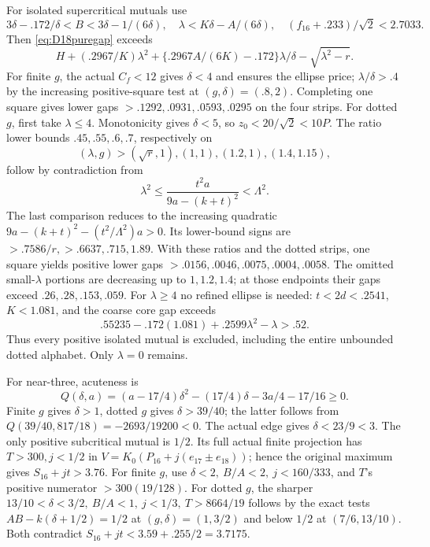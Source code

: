 For isolated supercritical mutuals use
\[
 3\delta-.172/\delta<B<3\delta-1/(6\delta),\quad
 \lambda<K\delta-A/(6\delta),\quad
 (f_{16}+.233)/\sqrt2<2.7033.
\]
Then \eqref{eq:D18puregap} exceeds
\[
 H+(.2967/K)\lambda^2+
 \{.2967A/(6K)-.172\}\lambda/\delta-\sqrt{\lambda^2-r}.
\]
For finite \(g\), the actual \(C_f<12\) gives \(\delta<4\)
and ensures the ellipse price; \(\lambda/\delta>.4\)
by the increasing positive-square test at \((g,\delta)=(.8,2)\).
Completing one square gives lower gaps
\(>.1292,.0931,.0593,.0295\) on the four strips.
For dotted \(g\), first take \(\lambda\leq4\).
Monotonicity gives \(\delta<5\), so
\(z_0<20/\sqrt2<10P\).
The ratio lower bounds \(.45,.55,.6,.7\), respectively on
\[
 (\lambda,g)>(\sqrt r,1),(1,1),(1.2,1),(1.4,1.15),
\]
follow by contradiction from
\[
 \lambda^2\leq \frac{t^2a}{9a-(k+t)^2}<\Lambda^2 .
\]
The last comparison reduces to the increasing quadratic
\(9a-(k+t)^2-(t^2/\Lambda^2)a>0\).
Its lower-bound signs are \(>.7586/r,>.6637,.715,1.89\).
With these ratios and the dotted strips, one square yields positive
lower gaps \(>.0156,.0046,.0075,.0004,.0058\).
The omitted small-\(\lambda\) portions are decreasing up to
\(1,1.2,1.4\); at those endpoints their gaps exceed
\(.26,.28,.153,.059\).
For \(\lambda\geq4\) no refined ellipse is needed:
\(t<2d<.2541\), \(K<1.081\), and the coarse core gap exceeds
\[
 .55235-.172(1.081)+.2599\lambda^2-\lambda>.52 .
\]
Thus every positive isolated mutual is excluded, including the entire
unbounded dotted alphabet. Only \(\lambda=0\) remains.

For near-three, acuteness is
\[
 Q(\delta,a)=(a-17/4)\delta^2-(17/4)\delta-3a/4-17/16\geq0 .
\]
Finite \(g\) gives \(\delta>1\), dotted \(g\) gives
\(\delta>39/40\); the latter follows from
\(Q(39/40,817/18)=-2693/19200<0\).
The actual edge gives \(\delta<23/9<3\).
The only positive subcritical mutual is \(1/2\).
Its full actual finite projection has \(T>300,j<1/2\) in
\(V=K_0(P_{16}+j(e_{17}\pm e_{18}))\);
hence the original maximum gives \(S_{16}+jt>3.76\).
For finite \(g\), use \(\delta<2,\ B/A<2,\ j<160/333\),
and \(T\)'s positive numerator \(>300(19/128)\).
For dotted \(g\), the sharper
\(13/10<\delta<3/2,\ B/A<1,\ j<1/3,\ T>8664/19\)
follows by the exact tests
\(A B-k(\delta+1/2)=1/2\) at \((g,\delta)=(1,3/2)\)
and below \(1/2\) at \((7/6,13/10)\).
Both contradict \(S_{16}+jt<3.59+.255/2=3.7175\).

